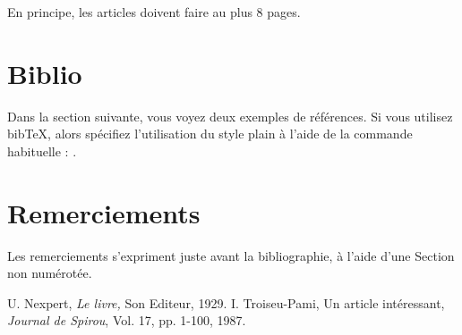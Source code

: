 \documentclass[french]{pfia}
\begin{document}
En principe, les articles doivent faire au plus 8 pages.

\section{Biblio}

Dans la section suivante, vous voyez deux exemples de références. Si vous utilisez bib\TeX, alors spécifiez l'utilisation du style plain à l'aide de la commande habituelle : \verb||.

\section*{Remerciements}
Les remerciements s'expriment juste avant la bibliographie, à l'aide d'une Section non numérotée.


\begin{thebibliography}{9}
U. Nexpert,
{\em Le livre,}
Son Editeur, 1929.
I. Troiseu-Pami,
 Un article intéressant,
{\em Journal de Spirou}, Vol. 17, pp. 1-100, 1987.
\end{thebibliography}
\end{document}
